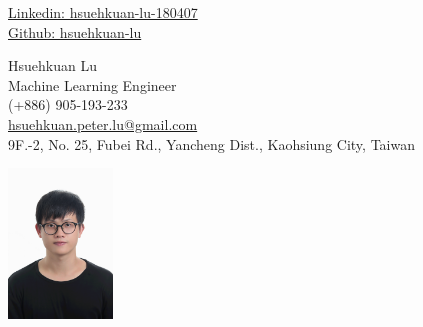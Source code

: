 \begin{center}
	\begin{minipage}[b]{0.24\textwidth}
		{\href{https://www.linkedin.com/in/hsuehkuan-lu-180407/}{Linkedin: hsuehkuan-lu-180407} } \\
		\href{https://github.com/hsuehkuan-lu}{Github: hsuehkuan-lu}
		
	\end{minipage}%
	\begin{minipage}[b]{0.5\textwidth}
		\centering
		{\HUGE Hsuehkuan Lu} \\ %
		\vspace{0.1cm}
		{\color{UI_blue} \Large{Machine Learning Engineer}} \\
		\large (+886) 905-193-233 \\
		\large \href{mailto:hsuehkuan.peter.lu@gmail.com}{hsuehkuan.peter.lu@gmail.com} \\
		\small 9F.-2, No. 25, Fubei Rd., Yancheng Dist., Kaohsiung City, Taiwan \\
	\end{minipage}%
	\begin{minipage}[b]{0.24\textwidth}
		\flushright \large  %
		\includegraphics[width=2.8cm, height=4cm]{images/me.jpg}
	\end{minipage}   
	
\end{center}